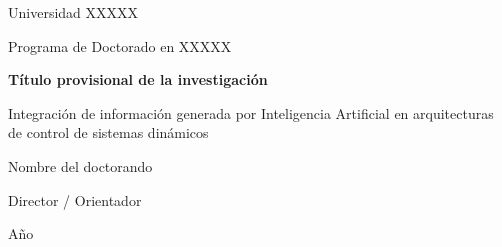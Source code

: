 \documentclass[12pt,a4paper]{report}
\begin{document}

\begin{titlepage}
    \centering
    
    {\Large Universidad XXXXX\par}
    \vspace{0.5cm}
    
    {\Large Programa de Doctorado en XXXXX\par}
    
    \vspace{3cm}
    
    {\LARGE \textbf{Título provisional de la investigación}\par}
    
    \vspace{1cm}
    
    {\large
    Integración de información generada por Inteligencia Artificial
    en arquitecturas de control de sistemas dinámicos
    \par}
    
    \vfill
    
    {\large Nombre del doctorando\par}
    {\large Director / Orientador\par}
    
    \vspace{1cm}
    
    {\large Año\par}
    
\end{titlepage}



\begin{abstract}

%
%
%
%
%
%
%
%
%

\end{abstract}
\end{document}
